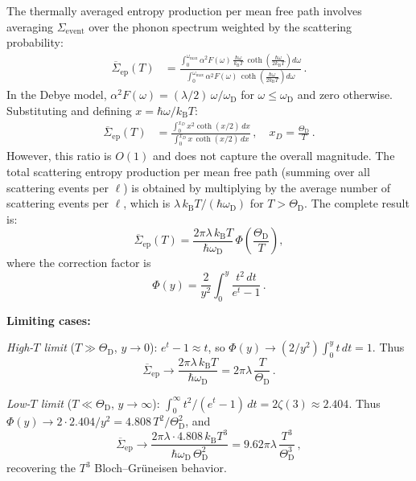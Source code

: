 \documentclass[prb,twocolumn,superscriptaddress,longbibliography,floatfix]{revtex4-2}
\newcommand{\kB}{k_{\mathrm{B}}}
\newcommand{\oD}{\omega_{\mathrm{D}}}
\newcommand{\ThetaD}{\Theta_{\mathrm{D}}}
\begin{document}
The thermally averaged entropy production per mean free path
involves averaging $\Sigma_{\mathrm{event}}$ over the phonon
spectrum weighted by the scattering probability:
\begin{align}\label{eq:S1_Sigma_avg}
  \overline{\Sigma}_{\mathrm{ep}}(T)
  &= \frac{\int_0^{\omega_{\max}} \alpha^2 F(\omega)\,
  \frac{\hbar\omega}{\kB T}\, \coth\!\left(\frac{\hbar\omega}{2\kB T}\right)
  d\omega}
  {\int_0^{\omega_{\max}} \alpha^2 F(\omega)\,
  \coth\!\left(\frac{\hbar\omega}{2\kB T}\right) d\omega}\,.
\end{align}
In the Debye model, $\alpha^2 F(\omega) = (\lambda/2)\,
\omega/\oD$ for $\omega \leq \oD$ and zero otherwise.
Substituting and defining $x = \hbar\omega/\kB T$:
\begin{align}
  \overline{\Sigma}_{\mathrm{ep}}(T)
  &= \frac{\int_0^{x_D} x^2 \coth(x/2)\, dx}
  {\int_0^{x_D} x\, \coth(x/2)\, dx}\,,
  \quad x_D = \frac{\ThetaD}{T}\,.
\end{align}
However, this ratio is $O(1)$ and does not capture the overall
magnitude.  The total scattering entropy production per mean
free path (summing over all scattering events per $\ell$)
is obtained by multiplying by the average number of scattering
events per $\ell$, which is $\lambda\, \kB T/(\hbar\oD)$ for
$T > \ThetaD$.  The complete result is:
\begin{equation}\label{eq:S1_Sigma_full}
  \overline{\Sigma}_{\mathrm{ep}}(T)
  = \frac{2\pi\lambda\, \kB T}{\hbar\oD}\, \Phi\!\left(\frac{\ThetaD}{T}\right),
\end{equation}
where the correction factor is
\begin{equation}\label{eq:S1_Phi}
  \Phi(y) = \frac{2}{y^2}\int_0^{y} \frac{t^2\, dt}{e^t - 1}\,.
\end{equation}

\textbf{Limiting cases:}

\noindent\emph{High-$T$ limit} ($T \gg \ThetaD$, $y \to 0$):
$e^t - 1 \approx t$, so $\Phi(y) \to (2/y^2)\int_0^y t\, dt = 1$.
Thus
\begin{equation}
  \overline{\Sigma}_{\mathrm{ep}} \to \frac{2\pi\lambda\, \kB T}{\hbar\oD}
  = 2\pi\lambda\, \frac{T}{\ThetaD}\,.
\end{equation}

\noindent\emph{Low-$T$ limit} ($T \ll \ThetaD$, $y \to \infty$):
$\int_0^\infty t^2/(e^t-1)\, dt = 2\zeta(3) \approx 2.404$.
Thus
$\Phi(y) \to 2 \cdot 2.404 / y^2 = 4.808\, T^2/\ThetaD^2$, and
\begin{equation}
  \overline{\Sigma}_{\mathrm{ep}} \to
  \frac{2\pi\lambda \cdot 4.808\, \kB T^3}{\hbar\oD\, \ThetaD^2}
  = 9.62\pi\lambda\, \frac{T^3}{\ThetaD^3}\,,
\end{equation}
recovering the $T^3$ Bloch--Gr\"uneisen behavior.
\end{document}
